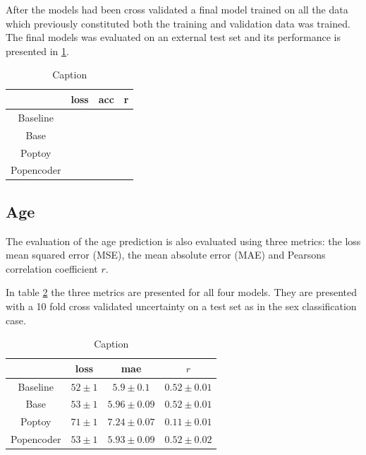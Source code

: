 After the models had been cross validated a final model trained on all the data which previously constituted both the training and validation data was trained. The final models was evaluated on an external test set and its performance is presented in \ref{tab:sex_final_model_results}.
\begin{table}[H]
    \centering
    \caption{Caption}
    \begin{tabular}{c|c|c|c}
         &  loss & acc & r\\ \hline
        Baseline &  &  &\\
        Base & & & \\
        Poptoy & & &\\
        Popencoder & & & \\
    \end{tabular}
    \label{tab:sex_final_model_results}
\end{table}

\subsection{Age}
The evaluation of the age prediction is also evaluated using three metrics: the loss mean squared error (MSE), the mean absolute error (MAE) and Pearsons correlation coefficient $r$. 

In table \ref{tab:age_model_results} the three metrics are presented for all four models. They are presented with a 10 fold cross validated uncertainty on a test set as in the sex classification case. 


\begin{table}[H]
    \centering
    \begin{tabular}{c|c|c|c}
         &  loss & mae & $r$ \\ \hline 
        Baseline &$52\pm1$& $5.9\pm0.1$&$0.52\pm0.01$\\
        Base & $53\pm1$& $5.96\pm 0.09 $& $0.52\pm0.01$\\
        Poptoy &$71\pm 1$ & $7.24\pm0.07$ &$ 0.11\pm 0.01$\\
        Popencoder &$53\pm1$& $5.93\pm 0.09$ & $0.52\pm0.02$\\
    \end{tabular}
    \caption{Caption}
    \label{tab:age_model_results}
\end{table}

